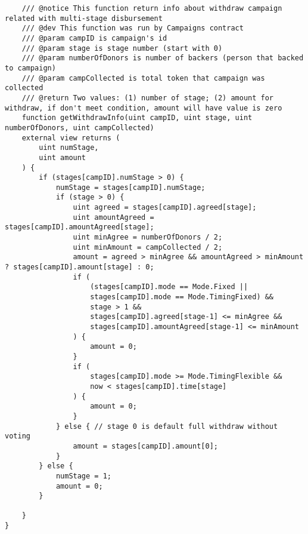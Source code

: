 \documentclass[../main-report.tex]{subfiles}
\begin{document}
\begin{lstlisting}
    /// @notice This function return info about withdraw campaign related with multi-stage disbursement
    /// @dev This function was run by Campaigns contract
    /// @param campID is campaign's id
    /// @param stage is stage number (start with 0)
    /// @param numberOfDonors is number of backers (person that backed to campaign)
    /// @param campCollected is total token that campaign was collected
    /// @return Two values: (1) number of stage; (2) amount for withdraw, if don't meet condition, amount will have value is zero
    function getWithdrawInfo(uint campID, uint stage, uint numberOfDonors, uint campCollected)
    external view returns (
        uint numStage,
        uint amount
    ) {
        if (stages[campID].numStage > 0) {
            numStage = stages[campID].numStage;
            if (stage > 0) {
                uint agreed = stages[campID].agreed[stage];
                uint amountAgreed = stages[campID].amountAgreed[stage];
                uint minAgree = numberOfDonors / 2;
                uint minAmount = campCollected / 2;
                amount = agreed > minAgree && amountAgreed > minAmount ? stages[campID].amount[stage] : 0;
                if (
                    (stages[campID].mode == Mode.Fixed ||
                    stages[campID].mode == Mode.TimingFixed) &&
                    stage > 1 &&
                    stages[campID].agreed[stage-1] <= minAgree &&
                    stages[campID].amountAgreed[stage-1] <= minAmount
                ) {
                    amount = 0;
                }
                if (
                    stages[campID].mode >= Mode.TimingFlexible &&
                    now < stages[campID].time[stage]
                ) {
                    amount = 0;
                }
            } else { // stage 0 is default full withdraw without voting
                amount = stages[campID].amount[0];
            }
        } else {
            numStage = 1;
            amount = 0;
        }

    }
}
\end{lstlisting}
\end{document}
